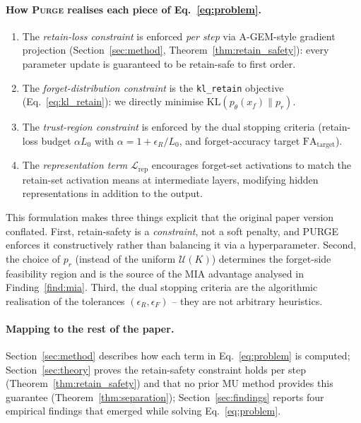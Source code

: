 \documentclass{article}
\newcommand{\ours}{\textsc{Purge}}
\newcommand{\klr}{\texttt{kl\_retain}}
\newcommand{\KL}{\mathrm{KL}}
\newcommand{\lossrep}{\mathcal{L}_{\mathrm{rep}}}
\begin{document}
{\paragraph{How \ours{} realises each piece of Eq.~\ref{eq:problem}.}
\begin{enumerate}[nosep,leftmargin=*]
  \item The \emph{retain-loss constraint} is enforced \emph{per step} via A-GEM-style gradient projection (Section~\ref{sec:method}, Theorem~\ref{thm:retain_safety}): every parameter update is guaranteed to be retain-safe to first order.
  \item The \emph{forget-distribution constraint} is the \klr{} objective (Eq.~\ref{eq:kl_retain}): we directly minimise $\KL(p_\theta(x_f)\|p_r)$.
  \item The \emph{trust-region constraint} is enforced by the dual stopping criteria (retain-loss budget $\alpha L_0$ with $\alpha = 1 + \epsilon_R / L_0$, and forget-accuracy target $\text{FA}_{\text{target}}$).
  \item The \emph{representation term} $\lossrep$ encourages forget-set activations to match the retain-set activation means at intermediate layers, modifying hidden representations in addition to the output.
\end{enumerate}

This formulation makes three things explicit that the original paper version conflated. First, retain-safety is a \emph{constraint}, not a soft penalty, and PURGE enforces it constructively rather than balancing it via a hyperparameter. Second, the choice of $p_r$ (instead of the uniform $\mathcal{U}(K)$) determines the forget-side feasibility region and is the source of the MIA advantage analysed in Finding~\ref{find:mia}. Third, the dual stopping criteria are the algorithmic realisation of the tolerances $(\epsilon_R, \epsilon_F)$ -- they are not arbitrary heuristics.

\paragraph{Mapping to the rest of the paper.} Section~\ref{sec:method} describes how each term in Eq.~\ref{eq:problem} is computed; Section~\ref{sec:theory} proves the retain-safety constraint holds per step (Theorem~\ref{thm:retain_safety}) and that no prior MU method provides this guarantee (Theorem~\ref{thm:separation}); Section~\ref{sec:findings} reports four empirical findings that emerged while solving Eq.~\ref{eq:problem}.
}
\end{document}
